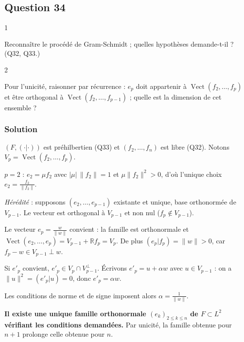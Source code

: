 \documentclass[11pt,a4paper]{article}
\newcommand{\equationajustee}[1]{%
  \sbox{\boiteequation}{$\displaystyle #1$}%
  \ifdim\wd\boiteequation>\linewidth
    \[\resizebox{\linewidth}{!}{\usebox{\boiteequation}}\]%
  \else
    \[#1\]%
  \fi}
\begin{document}
\hypertarget{question-34}{%
\subsection{Question 34}\label{question-34}}

\begin{indication}{1}

Reconnaître le procédé de Gram-Schmidt ; quelles hypothèses demande-t-il ? (Q32, Q33.)

\end{indication}

\begin{indication}{2}

Pour l'unicité, raisonner par récurrence : \(e_p\) doit appartenir à \(\operatorname{Vect}(f_2,\dots,f_p)\) et être orthogonal à \(\operatorname{Vect}(f_2,\dots,f_{p-1})\) ; quelle est la dimension de cet ensemble ?

\end{indication}

\hypertarget{solution-33}{%
\subsubsection{Solution}\label{solution-33}}

\((F,(\cdot|\cdot))\) est préhilbertien (Q33) et \((f_2,\dots,f_n)\) est libre (Q32). Notons \(V_p=\operatorname{Vect}(f_2,\dots,f_p)\).

\emph{\(p=2\)} : \(e_2=\mu f_2\) avec \(|\mu|\,\|f_2\|=1\) et \(\mu\|f_2\|^2>0\), d'où l'unique choix \(e_2=\frac{f_2}{\|f_2\|}\).

\emph{Hérédité} : supposons \((e_2,\dots,e_{p-1})\) existante et unique, base orthonormée de \(V_{p-1}\). Le vecteur
\equationajustee{w=f_p-\sum_{j<p}(f_p|e_j)e_j}
est orthogonal à \(V_{p-1}\) et non nul (\(f_p\notin V_{p-1}\)).

Le vecteur \(e_p=\frac w{\|w\|}\) convient : la famille est orthonormale et \(\operatorname{Vect}(e_2,\dots,e_p)=V_{p-1}+\mathbb Rf_p=V_p\). De plus \((e_p|f_p)=\|w\|>0\), car \(f_p-w\in V_{p-1}\perp w\).

Si \(e'_p\) convient, \(e'_p\in V_p\cap V_{p-1}^\perp\). Écrivons \(e'_p=u+\alpha w\) avec \(u\in V_{p-1}\) : on a \(\|u\|^2=(e'_p|u)=0\), donc \(e'_p=\alpha w\).

Les conditions de norme et de signe imposent alors \(\alpha=\frac1{\|w\|}\).

\textbf{Il existe une unique famille orthonormale \((e_k)_{2\leqslant k\leqslant n}\) de \(F\subset L^2\) vérifiant les conditions demandées.} Par unicité, la famille obtenue pour \(n+1\) prolonge celle obtenue pour \(n\).
\end{document}
